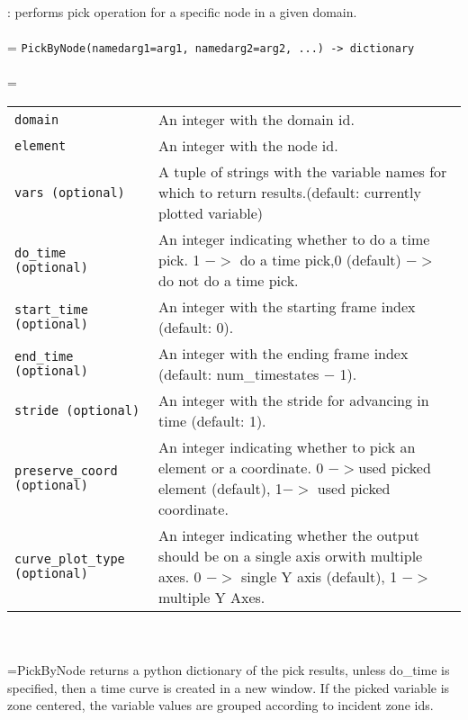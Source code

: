 \documentclass[10pt,a4paper]{report}
\begin{document}
{}
: performs pick operation for a specific node in a given domain.\\[-3mm]

 \\ 
\hangindent=\parindent 
\verb!PickByNode(namedarg1=arg1, namedarg2=arg2, ...) -> dictionary!\\ [-3mm]

 \\ 
\hangindent=\parindent 
\begin{tabular}{lp{9cm}}
\verb!domain! & An integer with the domain id. \\
\verb!element! & An integer with the node id. \\
\verb!vars (optional)! & A tuple of strings with the variable names for which to return results.(default: currently plotted variable) \\
\verb!do_time (optional)! & An integer indicating whether to do a time pick. 1 $-$$>$ do a time pick,0 (default) $-$$>$ do not do a time pick. \\
\verb!start_time (optional)! & An integer with the starting frame index (default: 0). \\
\verb!end_time (optional)! & An integer with the ending frame index (default: num\_timestates $-$ 1). \\
\verb!stride (optional)! & An integer with the stride for advancing in time (default: 1). \\
\verb!preserve_coord (optional)! & An integer indicating whether to pick an element or a coordinate. 0 $-$$>$used picked element (default), 1$-$$>$ used picked coordinate. \\
\verb!curve_plot_type (optional)! & An integer indicating whether the output should be on a single axis orwith multiple axes. 0 $-$$>$ single Y axis (default), 1 $-$$>$ multiple Y Axes. \\
\end{tabular} \\[-2mm]


 \\ 
\hangindent=\parindent PickByNode returns a python dictionary of the pick results, unless do\_time is specified, then a time curve is created in a new window. If the picked variable is zone centered, the variable values are grouped according to incident zone ids. \\[-3mm] 
\end{document}
